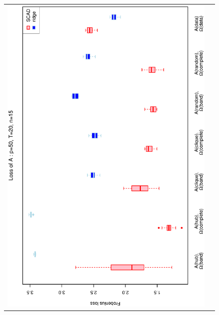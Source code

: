 \begin{figure}[h!]
\centering
\begin{tabular}{cc}
\includegraphics[scale=0.45,angle=270]{LossA50T20N15_5.eps}
\\

\end{tabular}
\end{figure}

